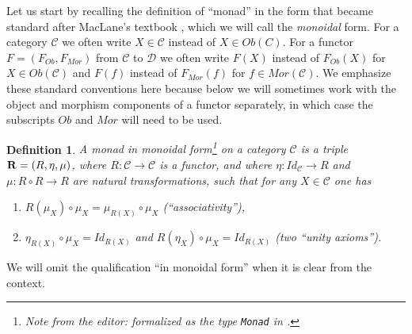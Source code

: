 \documentclass[12pt]{amsart}
\newtheorem{definition}[proposition]{Definition}
\numberwithin{proposition}{subsection}
\newcommand{\llabel}[1]{\label{#1}}
\newcommand{\sr}{\rightarrow}
\newcommand{\R}{{\bf R}}
\newcommand{\C}{{\mathcal C}}
\newcommand{\D}{{\mathcal D}}
\newcommand{\editorfootnote}[1]{\footnote{Note from the editor: #1}}
\begin{document}
Let us start by recalling the definition of ``monad'' in the form that became
standard after MacLane's textbook \cite[p.~133]{MacLane}, which we will call
the {\em monoidal} form. For a category $\C$ we often write $X\in\C$ instead of
$X\in Ob(C)$. For a functor $F=(F_{Ob},F_{Mor})$ from $\C$ to $\D$ we often
write $F(X)$ instead of $F_{Ob}(X)$ for $X\in Ob(\C)$ and $F(f)$ instead of
$F_{Mor}(f)$ for $f\in Mor(\C)$.  We emphasize these standard conventions here
because below we will sometimes work with the object and morphism components of
a functor separately, in which case the subscripts $Ob$ and $Mor$ will need to
be used.
%
\begin{definition}
  \llabel{2017.04.01.def1}
  A {\em monad in monoidal form}\editorfootnote{formalized as the type {\tt Monad} in \cite{UniMath}.}
  on a category $\C$ is a triple $\R=(R,\eta,\mu)$,
  where $R:\C\sr \C$ is a functor, and where $\eta:Id_{\C}\sr R$ and $\mu:R\circ R\sr R$
  are natural transformations, such that for any $X\in\C$ one has
  \begin{enumerate}
  \item \llabel{2017.04.19.eq7} $R(\mu_X)\circ \mu_{X}=\mu_{R(X)}\circ \mu_X$ (``associativity''),
  \item \llabel{2017.04.19.eq8} $\eta_{R(X)}\circ \mu_X=Id_{R(X)}$ and $R(\eta_X)\circ \mu_X=Id_{R(X)}$ (two ``unity axioms'').
  \end{enumerate}
\end{definition}
%
We will omit the qualification ``in monoidal form'' when it is clear from the context. 
\end{document}
